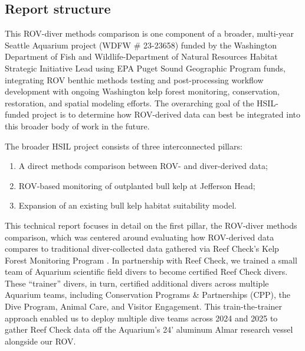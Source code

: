 \documentclass[11pt]{article}
\begin{document}
\subsection{Report structure}
\label{subsec:report_structure}

This ROV-diver methods comparison is one component of a broader, multi-year 
Seattle Aquarium project (WDFW $\#$ 23-23658) funded by the Washington 
Department of Fish and Wildlife-Department of Natural Resources Habitat 
Strategic Initiative Lead using EPA Puget Sound Geographic Program funds, 
integrating ROV benthic methods testing and post-processing workflow 
development with ongoing Washington kelp forest monitoring, conservation, 
restoration, and spatial modeling efforts.
The overarching goal of the HSIL-funded project is to determine how ROV-derived data can best be integrated into this broader body of work in the future.

\vspace{2.5mm}\noindent The broader HSIL project consists of three 
interconnected pillars:

\begin{enumerate}[font=\bfseries]
\item A direct methods comparison between ROV- and diver-derived data; 
\item ROV-based monitoring of outplanted bull kelp at Jefferson Head;
\item Expansion of an existing bull kelp habitat suitability model.
\end{enumerate}

\noindent This technical report focuses in detail on the first pillar, the 
ROV-diver methods comparison, which was centered around evaluating how 
ROV-derived data compares to traditional diver-collected data gathered via Reef 
Check's Kelp Forest Monitoring Program \citep{ReefCheckCalifornia:2021aa, 
Freiwald2021}.
In partnership with Reef Check, we trained a small team of Aquarium scientific field divers to become certified Reef Check divers.
These ``trainer'' divers, in turn, certified additional divers across multiple Aquarium teams, including Conservation Programs \& Partnerships (CPP), the Dive Program, Animal Care, and Visitor Engagement.
This train-the-trainer approach enabled us to deploy multiple dive teams across 
2024 and 2025 to gather Reef Check data off the Aquarium's 24' aluminum Almar 
research vessel alongside our ROV. 
\end{document}
